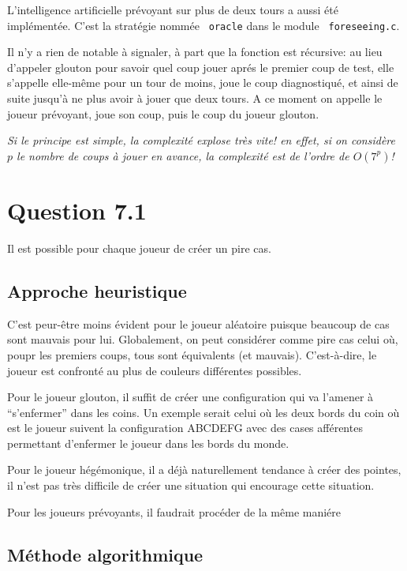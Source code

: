 \documentclass[a4paper,11pt]{article}
\newcommand{\dbend}{{\manual\char127}}
\newenvironment{attention}%
{\description\item[\dbend]\sl}%
{\enddescription}
\begin{document}
L'intelligence artificielle prévoyant sur plus de deux tours a aussi été implémentée. C'est la stratégie nommée \texttt{ oracle} dans le module \texttt{ foreseeing.c}.

Il n'y a rien de notable à signaler, à part que la fonction est récursive: au lieu d'appeler glouton pour savoir quel coup jouer aprés le premier coup de test, elle s'appelle elle-même pour un tour de moins, joue le coup diagnostiqué, et ainsi de suite jusqu'à ne plus avoir à jouer que deux tours. A ce moment on appelle le joueur prévoyant, joue son coup, puis le coup du joueur glouton.

\begin{attention}
  Si le principe est simple, la complexité explose très vite! en effet, si on considère $p$ le nombre de coups à jouer en avance, la complexité est de l'ordre de $O(7^p)$!
\end{attention}

\section*{Question 7.1}

Il est possible pour chaque joueur de créer un pire cas.

\subsection*{Approche heuristique}

C'est peur-être moins évident pour le joueur aléatoire puisque beaucoup de cas sont mauvais pour lui. Globalement, on peut considérer comme pire cas celui où, poupr les premiers coups, tous sont équivalents (et mauvais). C'est-à-dire, le joueur est confronté au plus de couleurs différentes possibles.

Pour le joueur glouton, il suffit de créer une configuration qui va l'amener à ``s'enfermer'' dans les coins. Un exemple serait celui où les deux bords du coin où est le joueur suivent la configuration ABCDEFG avec des cases afférentes permettant d'enfermer le joueur dans les bords du monde.

Pour le joueur hégémonique, il a déjà naturellement tendance à créer des pointes, il n'est pas très difficile de créer une situation qui encourage cette situation.

Pour les joueurs prévoyants, il faudrait procéder de la même maniére

\subsection*{Méthode algorithmique}
\end{document}
